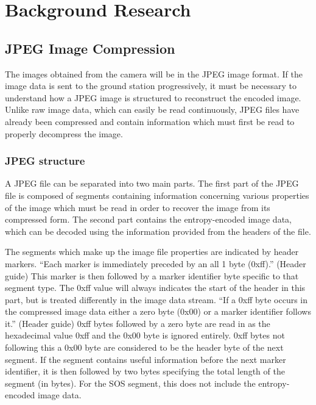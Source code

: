 \documentclass[oneside]{ecsgdp}         %
\begin{document}
\chapter{Background Research}

\section{JPEG Image Compression}
The images obtained from the camera will be in the JPEG image format. If the image data is sent to the ground station progressively, it must be necessary to understand how a JPEG image is structured to reconstruct the encoded image. Unlike raw image data, which can easily be read continuously, JPEG files have already been compressed and contain information which must first be read to properly decompress the image.

\subsection{JPEG structure}
A JPEG file can be separated into two main parts. The first part of the JPEG file is composed of segments containing information concerning various properties of the image which must be read in order to recover the image from its compressed form. The second part contains the entropy-encoded image data, which can be decoded using the information provided from the headers of the file.  

The segments which make up the image file properties are indicated by header markers. ``Each marker is immediately preceded by an all 1 byte (0xff).'' (Header guide) This marker is then followed by a marker identifier byte specific to that segment type. The 0xff value will always indicates the start of the header in this part, but is treated differently in the image data stream. ``If a 0xff byte occurs in the compressed image data either a zero byte (0x00) or a marker identifier follows it.'' (Header guide) 0xff bytes followed by a zero byte are read in as the hexadecimal value 0xff and the 0x00 byte is ignored entirely. 0xff bytes not following this a 0x00 byte are considered to be the header byte of the next segment. If the segment contains useful information before the next marker identifier, it is then followed by two bytes specifying the total length of the segment (in bytes). For the SOS segment, this does not include the entropy-encoded image data.
\end{document}
